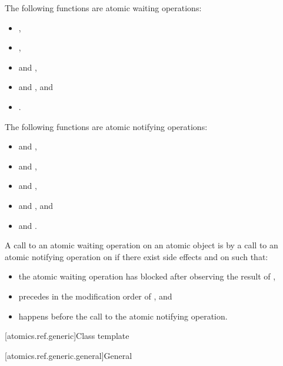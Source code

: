 \pnum
\begin{note}
The following functions are atomic waiting operations:
\begin{itemize}
\item {},
\item {},
\item {} and ,
\item {} and , and
\item {}.
\end{itemize}
\end{note}

\pnum
\begin{note}
The following functions are atomic notifying operations:
\begin{itemize}
\item {} and ,
\item {} and ,
\item {} and ,
\item {} and , and
\item {} and .
\end{itemize}
\end{note}

%
\pnum
A call to an atomic waiting operation on an atomic object 
is 
by a call to an atomic notifying operation on 
if there exist side effects  and  on  such that:
\begin{itemize}
\item the atomic waiting operation has blocked after observing the result of ,
\item {} precedes  in the modification order of , and
\item {} happens before the call to the atomic notifying operation.
\end{itemize}

[atomics.ref.generic]{Class template }

[atomics.ref.generic.general]{General}

